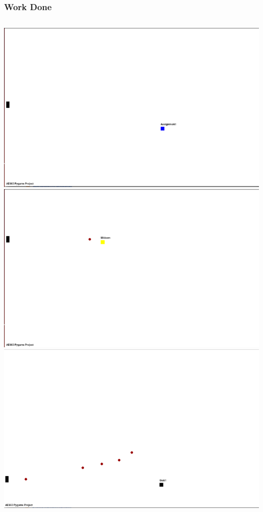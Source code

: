 \documentclass[]{beamer}
\begin{document}
\begin{frame}
  \frametitle{Work Done}
  \begin{center}
  \begin{columns}[c]
  \column{2.3in}
    \includegraphics[scale=0.21, frame]{./diagram/rsz_screen_01}\\
    \includegraphics[scale=0.21,  frame]{./diagram/rsz_screen_03}
  \column{2.3in}
  \includegraphics[scale=0.21, frame]{./diagram/rsz_screen_02}\\

\end{columns}
\end{center}
\end{frame}
\end{document}

